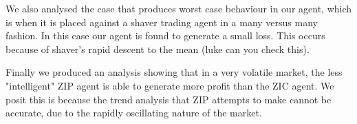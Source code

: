 \documentclass{acm_proc_article-sp}
\begin{document}
We also analysed the case that produces worst case behaviour in our agent,
which is when it is placed against a shaver trading agent in a many versus many
fashion. In this case our agent is found to generate a small loss. This occurs
because of shaver's rapid descent to the mean (luke can you check this).

Finally we produced an analysis showing that in a very volatile market, the
less "intelligent" ZIP agent is able to generate more profit than the ZIC
agent. We posit this is because the trend analysis that ZIP attempts to make
cannot be accurate, due to the rapidly oscillating nature of the market.

%
%
%
\appendix 
\end{document}
